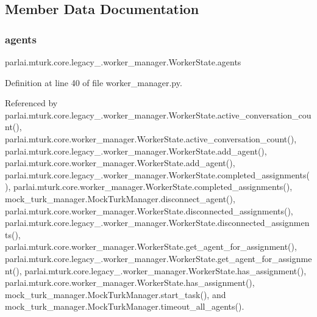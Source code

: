\subsection{Member Data Documentation}
\mbox{\label{classparlai_1_1mturk_1_1core_1_1legacy__2018_1_1worker__manager_1_1WorkerState_a4165b5a0b9ffcbd8194fd10adeb02fdb}} 
\subsubsection{\texorpdfstring{agents}{agents}}
{\footnotesize\ttfamily parlai.\+mturk.\+core.\+legacy\+\_.\+worker\+\_\+manager.\+Worker\+State.\+agents}



Definition at line 40 of file worker\+\_\+manager.\+py.



Referenced by parlai.\+mturk.\+core.\+legacy\+\_.\+worker\+\_\+manager.\+Worker\+State.\+active\+\_\+conversation\+\_\+count(), parlai.\+mturk.\+core.\+worker\+\_\+manager.\+Worker\+State.\+active\+\_\+conversation\+\_\+count(), parlai.\+mturk.\+core.\+legacy\+\_.\+worker\+\_\+manager.\+Worker\+State.\+add\+\_\+agent(), parlai.\+mturk.\+core.\+worker\+\_\+manager.\+Worker\+State.\+add\+\_\+agent(), parlai.\+mturk.\+core.\+legacy\+\_.\+worker\+\_\+manager.\+Worker\+State.\+completed\+\_\+assignments(), parlai.\+mturk.\+core.\+worker\+\_\+manager.\+Worker\+State.\+completed\+\_\+assignments(), mock\+\_\+turk\+\_\+manager.\+Mock\+Turk\+Manager.\+disconnect\+\_\+agent(), parlai.\+mturk.\+core.\+worker\+\_\+manager.\+Worker\+State.\+disconnected\+\_\+assignments(), parlai.\+mturk.\+core.\+legacy\+\_.\+worker\+\_\+manager.\+Worker\+State.\+disconnected\+\_\+assignments(), parlai.\+mturk.\+core.\+worker\+\_\+manager.\+Worker\+State.\+get\+\_\+agent\+\_\+for\+\_\+assignment(), parlai.\+mturk.\+core.\+legacy\+\_.\+worker\+\_\+manager.\+Worker\+State.\+get\+\_\+agent\+\_\+for\+\_\+assignment(), parlai.\+mturk.\+core.\+legacy\+\_.\+worker\+\_\+manager.\+Worker\+State.\+has\+\_\+assignment(), parlai.\+mturk.\+core.\+worker\+\_\+manager.\+Worker\+State.\+has\+\_\+assignment(), mock\+\_\+turk\+\_\+manager.\+Mock\+Turk\+Manager.\+start\+\_\+task(), and mock\+\_\+turk\+\_\+manager.\+Mock\+Turk\+Manager.\+timeout\+\_\+all\+\_\+agents().

